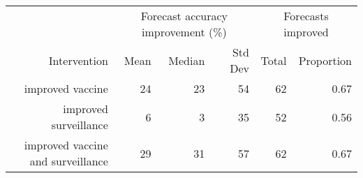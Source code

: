 
\begin{tabular*}{1.0\textwidth}{rrrrrr}
\toprule
             & \multicolumn{3}{c}{Forecast accuracy improvement (\%)} & \multicolumn{2}{c}{Forecasts improved} \\
Intervention & Mean & Median & Std Dev & Total & Proportion \\
\midrule

improved vaccine & 24 & 23 & 54 & 62 & 0.67 \\
improved surveillance & 6 & 3 & 35 & 52 & 0.56 \\
improved vaccine and surveillance & 29 & 31 & 57 & 62 & 0.67 \\

\bottomrule
\end{tabular*}

